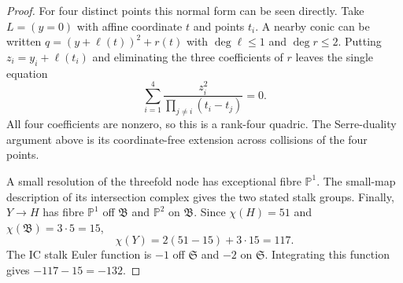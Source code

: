 \documentclass[10pt,a4paper]{amsart}
\newcommand{\Pp}{\mathbb P}
\begin{document}
\begin{proof}
For four distinct points this normal form can be seen directly.  Take
$L=(y=0)$ with affine coordinate $t$ and points $t_i$.  A nearby conic can
be written $q=(y+\ell(t))^2+r(t)$ with $\deg\ell\le1$ and $\deg r\le2$.
Putting $z_i=y_i+\ell(t_i)$ and eliminating the three coefficients of $r$
leaves the single equation
\[
 \sum_{i=1}^4\frac{z_i^2}{\prod_{j\ne i}(t_i-t_j)}=0.
\]
All four coefficients are nonzero, so this is a rank-four quadric.  The
Serre-duality argument above is its coordinate-free extension across
collisions of the four points.

A small resolution of the threefold node has exceptional fibre $\Pp^1$.
The small-map description of its intersection complex gives the two stated
stalk groups.  Finally, $Y\to H$ has fibre $\Pp^1$ off $\mathfrak B$ and
$\Pp^2$ on $\mathfrak B$.  Since
$\chi(H)=51$ and $\chi(\mathfrak B)=3\cdot5=15$,
\[
 \chi(Y)=2(51-15)+3\cdot15=117.
\]
The IC stalk Euler function is $-1$ off $\mathfrak S$ and $-2$ on
$\mathfrak S$.  Integrating this function gives
$-117-15=-132$.
\end{proof}
\end{document}
